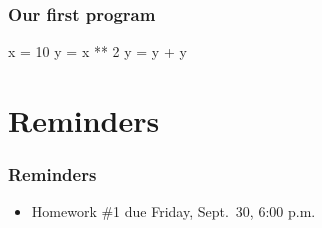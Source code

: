 \documentclass[11pt]{beamer}
\begin{document}
\begin{frame}[fragile]
  \frametitle{Our first program}
  \Enlarge

  \begin{semiverbatim}
x = 10
y = x ** 2
y = y + y
  \end{semiverbatim}
\end{frame}

\section{Reminders}

\begin{frame}
  \frametitle{Reminders}
  \Enlarge

  \begin{itemize}
  \item Homework \#1 due Friday, Sept.\ 30, 6:00 p.m.
  \end{itemize}
\end{frame}
\end{document}
